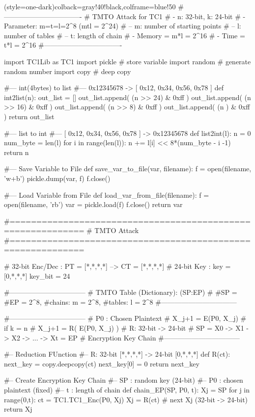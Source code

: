 \newpage
\begin{python}(style=one-dark){colback=gray!40!black,colframe=blue!50}
#----------------------------------
# TMTO Attack for TC1
# - n: 32-bit, k: 24-bit
# - Parameter: m=t=l=2^8 (mtl = 2^24)
# -- m: number of starting points
# -- l: number of tables
# -- t: length of chain
# - Memory = m*l = 2^16
# - Time   = t*l = 2^16
#----------------------------------

import TC1Lib as TC1
import pickle # store variable
import random # generate random number
import copy   # deep copy 

#--- int(4bytes) to list 
#--- 0x12345678 -> [ 0x12, 0x34, 0x56, 0x78 ]
def int2list(n):
   out_list = []
   out_list.append( (n >> 24) & 0xff )
   out_list.append( (n >> 16) & 0xff )
   out_list.append( (n >>  8) & 0xff )
   out_list.append( (n      ) & 0xff )
   return out_list

#--- list to int
#--- [ 0x12, 0x34, 0x56, 0x78 ] -> 0x12345678
def list2int(l):
   n = 0
   num_byte = len(l)
   for i in range(len(l)):
      n += l[i] << 8*(num_byte - i -1)
   return n

#--- Save Variable to File
def save_var_to_file(var, filename):
   f = open(filename, 'w+b')
   pickle.dump(var, f)
   f.close()

#--- Load Variable from File
def load_var_from_file(filename):
   f = open(filename, 'rb')
   var = pickle.load(f)
   f.close()
   return var

#============================================================
#  TMTO Attack
#============================================================

# 32-bit Enc/Dec : PT = [*,*,*,*] --> CT = [*,*,*,*]
# 24-bit Key     : key = [0,*,*,*]
key_bit = 24

#---------------------------------
# TMTO Table (Dictionary): { (SP:EP) }
#   #SP = #EP = 2^8,   #chains: m = 2^8, #tables: l = 2^8
#---------------------------------

#---------------------------------
# P0 : Chosen Plaintext
# X_{j+1} = E(P0, X_{j}) 		# if k = n
# X_{j+1} = R( E(P0, X_{j}) ) 	   # R: 32-bit -> 24-bit
# SP = X0 -> X1 -> X2 -> ... -> Xt = EP  # Encryption Key Chain
#---------------------------------

#-- Reduction FUnction
#-- R: 32-bit [*,*,*,*] -> 24-bit [0,*,*,*]
def R(ct):
   next_key = copy.deepcopy(ct)
   next_key[0] = 0
   return next_key

#-- Create Encryption Key Chain
#-- SP : random key (24-bit)
#-- P0 : chosen plaintext (fixed)
#-- t  : length of chain
def chain_EP(SP, P0, t):
   Xj = SP
   for j in range(0,t):
      ct = TC1.TC1_Enc(P0, Xj)
      Xj = R(ct)   # next Xj (32-bit -> 24-bit)
   return Xj


\end{python}
